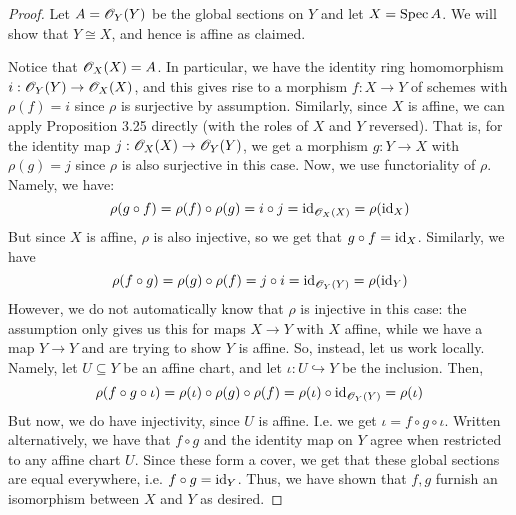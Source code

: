 \begin{proof}
	Let $A = \mathscr{O}_Y(Y)$ be the global sections on $Y$ and let $X = \operatorname{Spec} A$. We will show that $Y \cong X$, and hence is affine as claimed.
	
	Notice that $\mathscr{O}_X(X) = A$. In particular, we have the identity ring homomorphism $i : \mathscr{O}_Y(Y) \to \mathscr{O}_X(X)$, and this gives rise to a morphism $f : X \to Y$ of schemes with $\rho(f) = i$ since $\rho$ is surjective by assumption. Similarly, since $X$ is affine, we can apply Proposition 3.25 directly (with the roles of $X$ and $Y$ reversed). That is, for the identity map $j : \mathscr{O}_X(X) \to \mathscr{O}_Y(Y)$, we get a morphism $g : Y \to X$ with $\rho(g) = j$ since $\rho$ is also surjective in this case. Now, we use functoriality of $\rho$. Namely, we have:
	\[ \rho(g \circ f) = \rho(f) \circ \rho(g) = i \circ j = \operatorname{id}_{\mathscr{O}_X(X)} = \rho(\operatorname{id}_X) \]
	But since $X$ is affine, $\rho$ is also injective, so we get that $g \circ f = \operatorname{id}_X$. Similarly, we have
	\[ \rho(f \circ g) = \rho(g) \circ \rho(f) = j \circ i = \operatorname{id}_{\mathscr{O}_Y(Y)} = \rho(\operatorname{id}_Y) \]
	However, we do not automatically know that $\rho$ is injective in this case: the assumption only gives us this for maps $X \to Y$ with $X$ affine, while we have a map $Y \to Y$ and are trying to show $Y$ is affine. So, instead, let us work locally. Namely, let $U \subseteq Y$ be an affine chart, and let $\iota : U \hookrightarrow Y$ be the inclusion. Then,
	\[ \rho(f \circ g \circ \iota) = \rho(\iota) \circ \rho(g) \circ \rho(f) = \rho(\iota) \circ \operatorname{id}_{\mathscr{O}_Y(Y)} = \rho(\iota) \]
	But now, we do have injectivity, since $U$ is affine. I.e. we get $\iota = f \circ g \circ \iota$. Written alternatively, we have that $f \circ g$ and the identity map on $Y$ agree when restricted to any affine chart $U$. Since these form a cover, we get that these global sections are equal everywhere, i.e. $f \circ g = \operatorname{id}_Y$. Thus, we have shown that $f,g$ furnish an isomorphism between $X$ and $Y$ as desired.
\end{proof}
